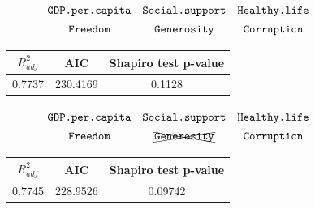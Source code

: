 \documentclass{beamer}
\begin{document}
\begin{frame}
    \begin{equation*}
    {\renewcommand*{\arraystretch}{1.4}
    \begin{array}{ccc}
    {\texttt{GDP.per.capita}} & {\texttt{Social.support}} & {\texttt{Healthy.life}} \\
    {\texttt{Freedom}}        & {\texttt{Generosity}}     & {\texttt{Corruption}}
    \end{array}}
    \end{equation*}

    \begin{figure}[h]
    \centering
    {\renewcommand\arraystretch{1.6}
    \begin{tabular}{|c|c|c|}
    \hline
    $R^2_{adj}$ & AIC & Shapiro test p-value \\
    \hline
    0.7737  & 230.4169 & 0.1128 \\
    \hline
    \end{tabular}}
    \end{figure}
\end{frame}

\begin{frame}
    \begin{equation*}
    {\renewcommand*{\arraystretch}{1.4}
    \begin{array}{ccc}
    {\texttt{GDP.per.capita}} & {\texttt{Social.support}} & {\texttt{Healthy.life}} \\
    {\texttt{Freedom}}        & \xcancel{\texttt{Generosity}}     & {\texttt{Corruption}}
    \end{array}}
    \end{equation*}

    \begin{figure}[h]
    \centering
    {\renewcommand\arraystretch{1.6}
    \begin{tabular}{|c|c|c|}
    \hline
    $R^2_{adj}$ & AIC & Shapiro test p-value \\
    \hline
    0.7745  & 228.9526 & 0.09742 \\
    \hline
    \end{tabular}}
    \end{figure}
\end{frame}
\end{document}
